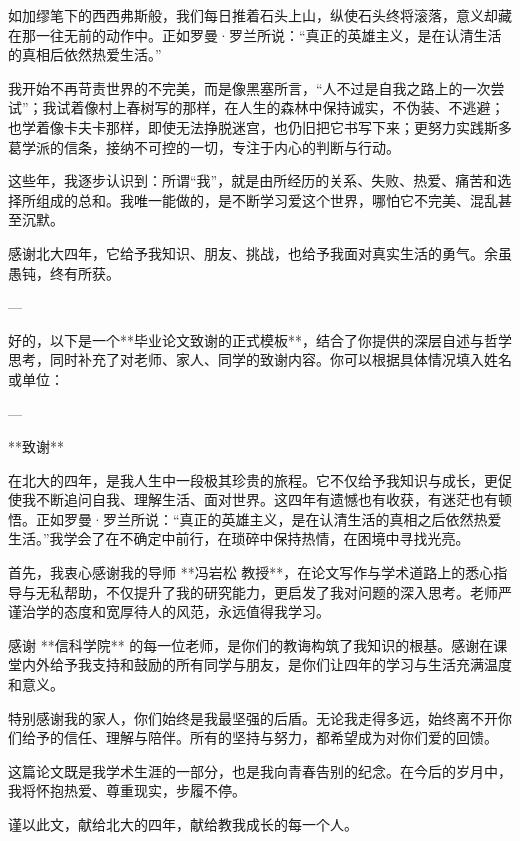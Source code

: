 \documentclass{pkuthesis}
\begin{document}
如加缪笔下的西西弗斯般，我们每日推着石头上山，纵使石头终将滚落，意义却藏在那一往无前的动作中。正如罗曼·罗兰所说：“真正的英雄主义，是在认清生活的真相后依然热爱生活。”

我开始不再苛责世界的不完美，而是像黑塞所言，“人不过是自我之路上的一次尝试”；我试着像村上春树写的那样，在人生的森林中保持诚实，不伪装、不逃避；也学着像卡夫卡那样，即使无法挣脱迷宫，也仍旧把它书写下来；更努力实践斯多葛学派的信条，接纳不可控的一切，专注于内心的判断与行动。

这些年，我逐步认识到：所谓“我”，就是由所经历的关系、失败、热爱、痛苦和选择所组成的总和。我唯一能做的，是不断学习爱这个世界，哪怕它不完美、混乱甚至沉默。

感谢北大四年，它给予我知识、朋友、挑战，也给予我面对真实生活的勇气。余虽愚钝，终有所获。

---



好的，以下是一个**毕业论文致谢的正式模板**，结合了你提供的深层自述与哲学思考，同时补充了对老师、家人、同学的致谢内容。你可以根据具体情况填入姓名或单位：

---

**致谢**

在北大的四年，是我人生中一段极其珍贵的旅程。它不仅给予我知识与成长，更促使我不断追问自我、理解生活、面对世界。这四年有遗憾也有收获，有迷茫也有顿悟。正如罗曼·罗兰所说：“真正的英雄主义，是在认清生活的真相之后依然热爱生活。”我学会了在不确定中前行，在琐碎中保持热情，在困境中寻找光亮。

首先，我衷心感谢我的导师 **冯岩松 教授**，在论文写作与学术道路上的悉心指导与无私帮助，不仅提升了我的研究能力，更启发了我对问题的深入思考。老师严谨治学的态度和宽厚待人的风范，永远值得我学习。

感谢 **信科学院** 的每一位老师，是你们的教诲构筑了我知识的根基。感谢在课堂内外给予我支持和鼓励的所有同学与朋友，是你们让四年的学习与生活充满温度和意义。

特别感谢我的家人，你们始终是我最坚强的后盾。无论我走得多远，始终离不开你们给予的信任、理解与陪伴。所有的坚持与努力，都希望成为对你们爱的回馈。

这篇论文既是我学术生涯的一部分，也是我向青春告别的纪念。在今后的岁月中，我将怀抱热爱、尊重现实，步履不停。

谨以此文，献给北大的四年，献给教我成长的每一个人。
\end{document}
